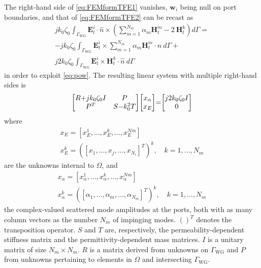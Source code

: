 \documentclass[journal,twoside,letterpaper]{IEEEtran}
\renewcommand{\vec}[1]{\mathbf{#1}}
\begin{document}
%
\noindent The right-hand side of \eqref{eq:FEMformTFE1} vanishes,  $\vec{w}_i$ being null on port boundaries, and that of \eqref{eq:FEMformTFE2}  can be recast as
\begin{multline*}
 j k_0 \zeta_0 \int_{\Gamma_\text{WG}}  \vec{E}_t^{i} \cdot \hat{n} \times \left( \sum_{m=1}^{N_m} \alpha_m \vec{H}_t^m - 2 \ \vec{H}_t^k \right) d\Gamma = \\
- j k_0 \zeta_0 \int_{\Gamma_\text{WG}} \vec{E}_t^{i} \times  \sum_{m=1}^{N_m} \alpha_m \vec{H}_t^m  \cdot \hat{n} \ d\Gamma + \\
j 2 k_0 \zeta_0 \int_{\Gamma_\text{WG}} \vec{E}_t^{i}  \times \vec{H}_t^k \cdot \hat{n} \ d\Gamma
\end{multline*}
\noindent in order to exploit \eqref{eq:pow}. The resulting linear system with multiple right-hand sides is
%
\begin{equation}
\label{eq:FEsys}
\thickmuskip=0mu
\medmuskip=0mu
\thinmuskip=0mu
\begin{bmatrix}
R + jk_0\zeta_0 I & P\\
P^T & S - k_0^2T
\end{bmatrix}
\begin{bmatrix}
x_\alpha \\
x_E
\end{bmatrix} =
\begin{bmatrix}
j2 k_0\zeta_0 I \\
0
\end{bmatrix}
\end{equation}
%
\noindent where 
\begin{gather*} 
\label{eq:xE}
x_E =\left[ x_E^1, \ldots,  x_E^k, \ldots,  x_E^{Nm} \right]\\
x_E^k = \left([x_1, \ldots, x_j, \ldots, x_{N_i}]^T\right)^k, \quad k=1,\ldots,N_m
\end{gather*}
%
\noindent are the unknowns internal to $\Omega$, and 
\begin{gather*} 
\label{eq:xA}
x_\alpha =\left[ x_\alpha^1, \ldots,  x_\alpha^k, \ldots,  x_\alpha^{Nm} \right]\\
x_\alpha^k = \left([\alpha_1, \ldots, \alpha_m, \ldots, \alpha_{N_m}]^T\right)^k, \quad k=1,\ldots,N_m
\end{gather*}
%
\noindent the complex-valued scattered mode amplitudes at the ports, both with as many column vectors as the number $N_m$ of impinging modes. $()^T$ denotes the transposition operator. $S$ and $T$ are, respectively, the permeability-dependent stiffness matrix and the permittivity-dependent mass matrices. $I$ is a unitary matrix of size $N_m \times N_m$. $R$ is a matrix derived from unknowns on $\Gamma_\text{WG}$ and $P$ from unknowns pertaining to elements in $\Omega$ and intersecting $\Gamma_\text{WG}$.
\end{document}
